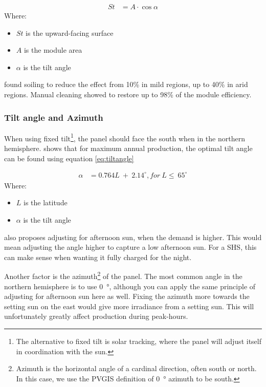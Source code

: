 \begin{align}
    St & = A \cdot \cos{\alpha}
    \label{eq:dustreduction}
\end{align}
Where:
\begin{itemize}
    \item $St$ is the upward-facing surface
    \item $A$ is the module area 
    \item $\alpha$ is the tilt angle
\end{itemize}
\citep{yakubuHolisticReviewEffects2025} found soiling to reduce the effect from 10\% in mild regions, up to 40\% in arid regions. Manual cleaning showed to restore up to 98\% of the module efficiency. 

\subsubsection{Tilt angle and Azimuth}
When using fixed tilt\footnote{The alternative to fixed tilt is solar tracking, where the panel will adjust itself in coordination with the sun.}, the panel should face the south when in the northern hemisphere. \citep{SolarEnergyEngineering2024} shows that for maximum annual production, the optimal tilt angle can be found using equation \eqref{eq:tiltangle}

\begin{align}
    \alpha & = 0.764L \ + \ 2.14^\circ, for \ L \leq \ 65^\circ
    \label{eq:tiltangle}
\end{align}
Where:
\begin{itemize}
    \item $L$ is the latitude
    \item $\alpha$ is the tilt angle
\end{itemize}

\citep{SolarEnergyEngineering2024} also proposes adjusting for afternoon sun, when the demand is higher. This would mean adjusting the angle higher to capture a low afternoon sun. For a SHS, this can make sense when wanting it fully charged for the night. 

Another factor is the azimuth\footnote{Azimuth is the horizontal angle of a cardinal direction, often south or north. In this case, we use the PVGIS definition of \SI{0}{\degree} azimuth to be south.} of the panel. The most common angle in the northern hemisphere is to use \SI{0}{\degree}, although you can apply the same principle of adjusting for afternoon sun here as well. Fixing the azimuth more towards the setting sun on the east would give more irradiance from a setting sun. This will unfortunately greatly affect production during peak-hours.
